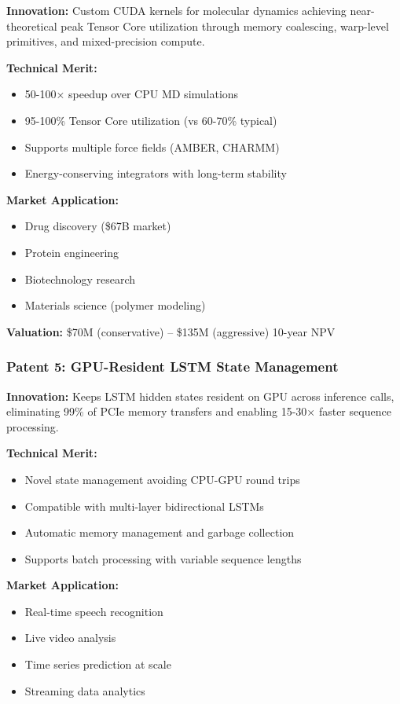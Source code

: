 \documentclass[11pt,letterpaper]{article}
\begin{document}
\textbf{Innovation:} Custom CUDA kernels for molecular dynamics achieving near-theoretical peak Tensor Core utilization through memory coalescing, warp-level primitives, and mixed-precision compute.

\textbf{Technical Merit:}
\begin{itemize}
    \item 50-100× speedup over CPU MD simulations
    \item 95-100\% Tensor Core utilization (vs 60-70\% typical)
    \item Supports multiple force fields (AMBER, CHARMM)
    \item Energy-conserving integrators with long-term stability
\end{itemize}

\textbf{Market Application:}
\begin{itemize}
    \item Drug discovery (\$67B market)
    \item Protein engineering
    \item Biotechnology research
    \item Materials science (polymer modeling)
\end{itemize}

\textbf{Valuation:} \$70M (conservative) -- \$135M (aggressive) 10-year NPV

\subsubsection{Patent 5: GPU-Resident LSTM State Management}

\textbf{Innovation:} Keeps LSTM hidden states resident on GPU across inference calls, eliminating 99\% of PCIe memory transfers and enabling 15-30× faster sequence processing.

\textbf{Technical Merit:}
\begin{itemize}
    \item Novel state management avoiding CPU-GPU round trips
    \item Compatible with multi-layer bidirectional LSTMs
    \item Automatic memory management and garbage collection
    \item Supports batch processing with variable sequence lengths
\end{itemize}

\textbf{Market Application:}
\begin{itemize}
    \item Real-time speech recognition
    \item Live video analysis
    \item Time series prediction at scale
    \item Streaming data analytics
\end{itemize}
\end{document}
